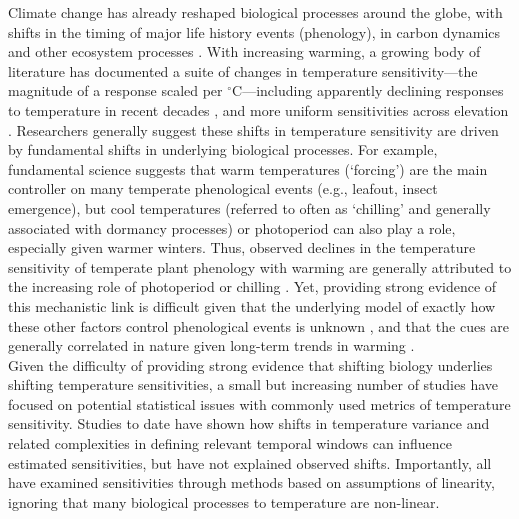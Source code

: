 \documentclass[11pt,letter]{article}
\begin{document}
Climate change has already reshaped biological processes around the globe, with shifts in the timing of major life history events (phenology), in carbon dynamics and other ecosystem processes \citep{IPCC:2014sm}. With increasing warming,  a growing body of literature has documented a suite of changes in temperature sensitivity---the magnitude of a response scaled per $^{\circ}$C---including apparently declining responses to temperature in recent decades \citep{fu2015,gusewell2017,piao2017,dai2019ag}, and more uniform sensitivities across elevation \citep{vitasse2018}. Researchers generally suggest these shifts in temperature sensitivity are driven by fundamental shifts in underlying biological processes. For example, fundamental science suggests that warm temperatures (`forcing') are the main controller on many temperate phenological events (e.g., leafout, insect emergence), but cool temperatures (referred to often as `chilling' and generally associated with dormancy processes) or photoperiod can also play a role, especially given warmer winters. Thus, observed declines in the temperature sensitivity of temperate plant phenology with warming are generally attributed to the increasing role of photoperiod or chilling  \citep[e.g.,][]{fu2015,gauzere2019}. Yet, providing strong evidence of this mechanistic link is difficult given that the underlying model of exactly how these other factors control phenological events is unknown \citep{chuine2016}, and that the cues are generally correlated in nature given long-term trends in warming \citep[e.g.,][]{fu2015}. \\


Given the difficulty of providing strong evidence that shifting biology underlies shifting temperature sensitivities, a small but increasing number of studies have focused on potential statistical issues with commonly used metrics of temperature sensitivity. Studies to date have shown how shifts in temperature variance and related complexities in defining relevant temporal windows \citep{clark2014a,gusewell2017,keenan2019} can influence estimated sensitivities, but have not explained observed shifts. Importantly, all have examined sensitivities through methods based on assumptions of linearity, ignoring that many biological processes to temperature are non-linear. \\
\end{document}
